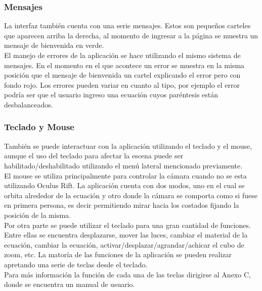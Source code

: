 \documentclass[12pt]{article}
\begin{document}
\subsubsection{Mensajes}
La interfaz también cuenta con una serie mensajes. Estos son pequeños carteles que aparecen arriba la derecha, al momento de ingresar a la página se muestra un mensaje de bienvenida en verde. 
\\El manejo de errores de la aplicación se hace utilizando el mismo sistema de mensajes. En el momento en el que acontece un error se muestra en la misma posición que el mensaje de bienvenida un cartel explicando el error pero con fondo rojo. Los errores pueden variar en cuanto al tipo, por ejemplo el error podría ser que el usuario ingreso una ecuación cuyos paréntesis están desbalanceados.
\subsubsection{Teclado y Mouse}
También se puede interactuar con la aplicación utilizando el teclado y el mouse, aunque el uso del teclado para afectar la escena puede ser habilitado/deshabilitado utilizando el menú lateral mencionado previamente.
\\El mouse se utiliza principalmente para controlar la cámara cuando no se esta utilizando Oculus Rift. La aplicación cuenta con dos modos, uno en el cual se orbita alrededor de la ecuación y otro donde la cámara se comporta como si fuese en primera persona, es decir permitiendo mirar hacia los costados fijando la posición de la misma.
\\Por otra parte se puede utilizar el teclado para una gran cantidad de funciones. Entre ellas se encuentra desplazarse, mover las luces, cambiar el material de la ecuación, cambiar la ecuación, activar/desplazar/agrandar/achicar el cubo de zoom, etc. La matoría de las funciones de la aplicación se pueden realizar apretando una serie de teclas desde el teclado.
\\Para más información la función de cada una de las teclas dirigirse al Anexo C, donde se encuentra un manual de usuario.
\clearpage
\end{document}
